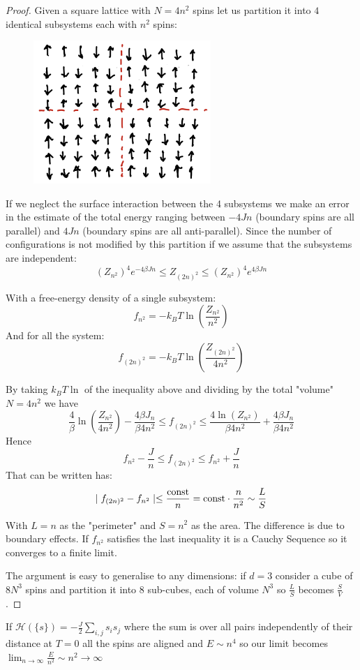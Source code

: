 \documentclass[../../Main/Main.tex]{subfiles}
\begin{document}
\begin{proof}
Given a square lattice with $N= 4n^{2}$ spins let us partition it into $4$ identical subsystems each with $n^{2}$ spins:

\begin{figure}[h!]
\centering
\includegraphics[width=0.6\textwidth]{./img/IMAGE1.png}
\end{figure}


If we neglect the surface interaction between the 4 subsystems we make an error in the estimate of the total energy ranging between $-4Jn$ (boundary spins are all parallel) and $4Jn$ (boundary spins are all anti-parallel).
Since the number of configurations is not modified by this partition if we assume that the subsystems are independent:
$$
(Z_{n^{2}})^{4} e^{-4\beta J{n}} \leq Z_{(2n)^{2}} \leq (Z_{n^{2}})^{4}e^{4\beta J{n}}
$$

With a free-energy density of a single subsystem:
$$f_{n^{2}} = -k_{B}T\ln\left( \frac{Z_{n^{2}}}{n^{2}} \right)$$
And for all the system:
$$f_{(2n)^{2}} = -k_{B}T\ln\left( \frac{Z_{(2n)^{2}}}{4n^{2}} \right)$$

By taking $k_{B}T\ln$ of the inequality above and dividing by the total "volume" $N = 4n^{2}$ we have
$$\frac{4}{\beta} \ln\left( \frac{Z_{n^{2}}}{4n^{2}} \right) - \frac{4\beta J_{n}}{\beta 4n^{2}} \leq f_{(2n)^{2}} \leq \frac{4\ln(Z_{n^{2}})}{\beta 4 n^{2}} + \frac{4\beta J_{n}}{\beta 4n^{2}}$$
Hence 
$$f_{n^{2}} - \frac{J}{n} \leq f_{(2n)^{2}} \leq f_{n^{2}} + \frac{J}{n}$$
That can be written has:
$$\mid f_{(2n)^{2}} - f_{n^{2}}\mid \leq \frac{\text{const}}{n} =\text{const} \cdot \frac{n}{n^{2}} \sim \frac{L}{S}$$

With $L =n$ as the "perimeter" and $S = n^{2}$ as the area. The difference is due to boundary effects.
If $f_{n^{2}}$ satisfies the last inequality it is a Cauchy Sequence so it converges to a finite limit.

The argument is easy to generalise to any dimensions: if $d=3$ consider a cube of $8N^{3}$ spins and partition it into $8$ sub-cubes, each of volume $N^{3}$ so $\frac{L}{S}$ becomes $\frac{S}{V}$.
\end{proof}
\begin{remark}
If $\mathcal{H}(\{ s \}) = -\frac{J}{2} \sum_{{i,j}} s_{i}s_{j}$ where the sum is over all pairs independently of their distance at $T = 0$ all the spins are aligned and $E \sim n^{4}$ so our limit becomes $\lim_{ n \to \infty } \frac{E}{n^{2}} \sim n^{2} \to \infty$
\end{remark}
\end{document}
